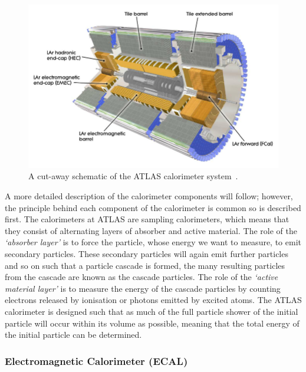 \begin{figure}[!ht]
  \begin{center}
    \includegraphics[width=0.8\linewidth, angle=0]{figs/Detector/Calo_schem.png}
  \end{center}
  \caption[A cut-away schematic of the ATLAS calorimeter system.]
          {A cut-away schematic of the ATLAS calorimeter system~\cite{det-ATLAS_Exp}.}
  \label{fig:det-calo_schem}
\end{figure}

A more detailed description of the calorimeter components will follow;
however, the principle behind each component of the calorimeter is common so is described first.
The calorimeters at ATLAS are sampling calorimeters, which means that they consist of alternating layers of absorber and active material.
The role of the \textit{`absorber layer'} is to force the particle, whose energy we want to measure, to emit secondary particles.
These secondary particles will again emit further particles and so on such that a particle cascade is formed,
the many resulting particles from the cascade are known as the cascade particles.
The role of the \textit{`active material layer'} is to measure the energy of the cascade particles %
by counting electrons released by ionisation or photons emitted by excited atoms.
The ATLAS calorimeter is designed such that as much of the full particle shower of the initial particle will occur within its volume as possible,
meaning that the total energy of the initial particle can be determined.

\subsubsection{Electromagnetic Calorimeter (ECAL)}

